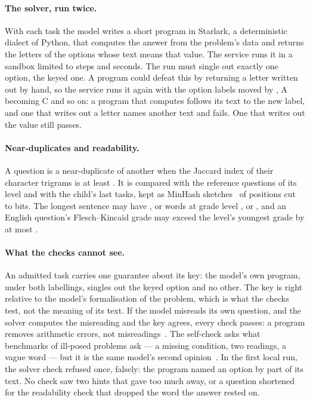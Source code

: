 \paragraph{The solver, run twice.} With each task the model writes a short program in Starlark, a deterministic dialect of Python, that computes the answer from the problem's data and returns the letters of the options whose text means that value. The service runs it in a sandbox limited to  steps and  seconds. The run must single out exactly one option, the keyed one. A program could defeat this by returning a letter written out by hand, so the service runs it again with the option labels moved by , A becoming C and so on: a program that computes follows its text to the new label, and one that writes out a letter names another text and fails. One that writes out the value still passes.

\paragraph{Near-duplicates and readability.} A question is a near-duplicate of another when the Jaccard index of their character trigrams is at least . It is compared with the reference questions of its level and with the child's last  tasks, kept as MinHash sketches~\cite{broder2000minwise} of  positions cut to  bits. The longest sentence may have ,  or  words at grade level ,  or , and an English question's Flesch--Kincaid grade may exceed the level's youngest grade by at most .

\paragraph{What the checks cannot see.}
\label{sec:limits}
An admitted task carries one guarantee about its key: the model's own program, under both labellings, singles out the keyed option and no other. The key is right relative to the model's formalisation of the problem, which is what the checks test, not the meaning of its text. If the model misreads its own question, and the solver computes the misreading and the key agrees, every check passes: a program removes arithmetic errors, not misreadings~\cite{chen2022program}. The self-check asks what benchmarks of ill-posed problems ask --- a missing condition, two readings, a vague word --- but it is the same model's second opinion~\cite{huang2023large}. In the first local run, the solver check refused once, falsely: the program named an option by part of its text. No check saw two hints that gave too much away, or a question shortened for the readability check that dropped the word the answer rested on.

